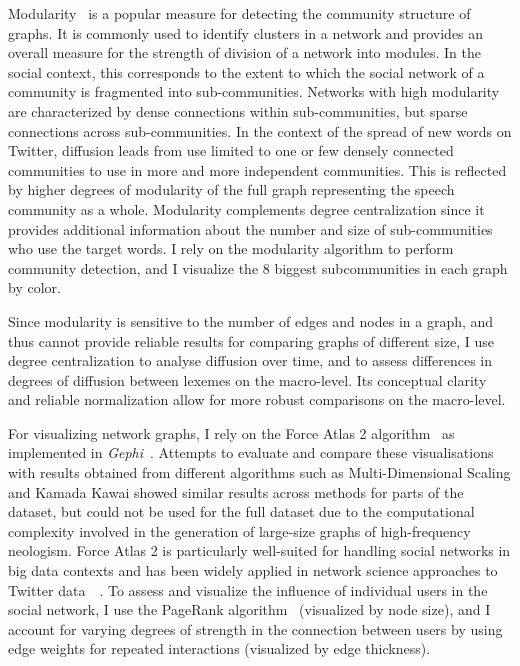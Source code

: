 \documentclass[
  a4paper,
  abstract=on,
  captions=tableabove
  ]{scrartcl}
\begin{document}
  Modularity~\parencite{Blondel2008FastUnfolding} is a popular measure for detecting the community structure of graphs. It is commonly used to identify clusters in a network and provides an overall measure for the strength of division of a network into modules. In the social context, this corresponds to the extent to which the social network of a community is fragmented into sub-communities. Networks with high modularity are characterized by dense connections within sub-communities, but sparse connections across sub-communities. In the context of the spread of new words on Twitter, diffusion leads from use limited to one or few densely connected communities to use in more and more independent communities. This is reflected by higher degrees of modularity of the full graph representing the speech community as a whole. Modularity complements degree centralization since it provides additional information about the number and size of sub-communities who use the target words. I rely on the modularity algorithm to perform community detection, and I visualize the 8 biggest subcommunities in each graph by color.

  Since modularity is sensitive to the number of edges and nodes in a graph, and thus cannot provide reliable results for comparing graphs of different size, I use degree centralization to analyse diffusion over time, and to assess differences in degrees of diffusion between lexemes on the macro-level. Its conceptual clarity and reliable normalization allow for more robust comparisons on the macro-level.

  For visualizing network graphs, I rely on the Force Atlas 2 algorithm~\parencite{Jacomy2014ForceAtlas2Continuous} as implemented in \emph{Gephi}~\parencite{Bastian2009GephiOpen}. Attempts to evaluate and compare these visualisations with results obtained from different algorithms such as Multi-Dimensional Scaling and Kamada Kawai showed similar results across methods for parts of the dataset, but could not be used for the full dataset due to the computational complexity involved in the generation of large-size graphs of high-frequency neologism. Force Atlas 2 is particularly well-suited for handling social networks in big data contexts and has been widely applied in network science approaches to Twitter data~ \parencite{Bruns2012HowLong,Gerlitz2013MiningOne,Bliss2012TwitterReciprocal}. To assess and visualize the influence of individual users in the social network, I use the PageRank algorithm~\parencite{Brin1998AnatomyLargeScale} (visualized by node size), and I account for varying degrees of strength in the connection between users by using edge weights for repeated interactions (visualized by edge thickness).
\end{document}
